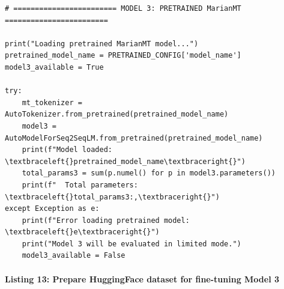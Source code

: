 \documentclass[12pt,a4paper,oneside]{report}
\begin{document}
\begin{Verbatim}[commandchars=\\\{\},breaklines=true,breakanywhere=true,fontsize=\scriptsize,frame=leftline,framesep=2mm,rulecolor=\color{gray}]
# ======================== MODEL 3: PRETRAINED MarianMT ========================

print("Loading pretrained MarianMT model...")
pretrained_model_name = PRETRAINED_CONFIG['model_name']
model3_available = True

try:
    mt_tokenizer = AutoTokenizer.from_pretrained(pretrained_model_name)
    model3 = AutoModelForSeq2SeqLM.from_pretrained(pretrained_model_name)
    print(f"Model loaded: \textbraceleft{}pretrained_model_name\textbraceright{}")
    total_params3 = sum(p.numel() for p in model3.parameters())
    print(f"  Total parameters: \textbraceleft{}total_params3:,\textbraceright{}")
except Exception as e:
    print(f"Error loading pretrained model: \textbraceleft{}e\textbraceright{}")
    print("Model 3 will be evaluated in limited mode.")
    model3_available = False
\end{Verbatim}
\paragraph{Listing 13: Prepare HuggingFace dataset for fine-tuning Model 3}\mbox{}\\[-1ex]
\end{document}
